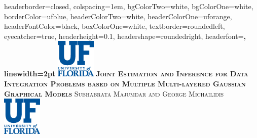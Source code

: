 \documentclass[landscape,a0paper,fontscale=0.4]{baposter} %
\begin{document}
\newtheorem{Theorem}{Theorem}[section]
\newtheorem{Lemma}[Theorem]{Lemma}
\newtheorem{Corollary}[Theorem]{Corollary}
\newtheorem{Proposition}[Theorem]{Proposition}
\newtheorem{Conjecture}[Theorem]{Conjecture}
\theoremstyle{definition} \newtheorem{Definition}[Theorem]{Definition}
\newtheorem{Example}{Example}[section]
\newtheorem{Algorithm}{Algorithm}
\newtheorem{Remark}{Remark}

\begin{poster}
{
headerborder=closed, %
colspacing=1em, %
bgColorTwo=white, %
bgColorOne=white, %
borderColor=ufblue, %
headerColorTwo=white, %
headerColorOne=uforange, %
headerFontColor=black, %
boxColorOne=white, %
textborder=roundedleft, %
eyecatcher=true, %
headerheight=0.1\textheight, %
headershape=roundedright, %
headerfont=\Large\bf\textsc, %
linewidth=2pt %
}
%
{\includegraphics[height=5em]{Vertical_Signature_Blue}} %
{\huge{\bf\textsc{Joint Estimation and Inference for Data Integration Problems based on Multiple Multi-layered Gaussian Graphical Models}}\vspace{0.5em}} %
{\textsc{ Subhabrata Majumdar and George Michailidis }}
{\includegraphics[height=5em]{Vertical_Signature_Blue}} %


\end{poster}
\end{document}
